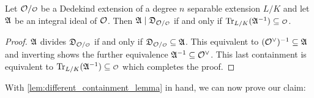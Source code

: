     \begin{lemma}\label{lem:different_containment_lemma}
      Let $\mc{O}/\smc{O}$ be a Dedekind extension of a degree $n$ separable extension $L/K$ and let $\mathfrak{A}$ be an integral ideal of $\mathcal{O}$. Then $\mf{A} \mid \mf{D}_{\mc{O}/\smc{O}}$ if and only if $\Trace_{L/K}(\mf{A}^{-1}) \subseteq \smc{O}$.
    \end{lemma}
    \begin{proof}
      $\mathfrak{A}$ divides $\mf{D}_{\mc{O}/\smc{O}}$ if and only if $\mf{D}_{\mc{O}/\smc{O}} \subseteq \mf{A}$. This equivalent to $(\mathcal{O}^{\vee})^{-1} \subseteq \mathfrak{A}$ and inverting shows the further equivalence $\mathfrak{A}^{-1} \subseteq \mathcal{O}^{\vee}$. This last containment is equivalent to $\Trace_{L/K}(\mf{A}^{-1}) \subseteq \smc{O}$ which completes the proof.
    \end{proof}

    With \cref{lem:different_containment_lemma} in hand, we can now prove our claim:

